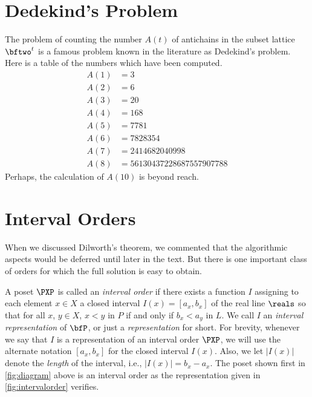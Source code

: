 \section{Dedekind's Problem}\label{s:posets:subset-lattice:dedekind}

The problem of counting the number $A(t)$ of antichains 
in the subset lattice $\bftwo^t$ is a famous problem known 
in the literature as Dedekind's problem.  Here is a table of 
the numbers which have been computed.
\begin{align*}
A(1)&=3\\
A(2)&=6\\
A(3)&=20\\
A(4)&=168\\
A(5)&=7781\\
A(6)&=7828354\\
A(7)&=2414682040998\\
A(8)&=56130437228687557907788
\end{align*}
Perhaps, the calculation of $A(10)$ is beyond reach.

\section{Interval Orders}\label{s:posets:intervalorder}

When we discussed Dilworth's theorem, we commented that the
algorithmic aspects would be deferred until later in the text.  But
there is one important class of orders for which the full solution is
easy to obtain.

A poset $\PXP$ is called an \textit{interval order} if there
exists a function $I$ assigning to each element $x\in X$ a closed
interval $I(x)=[a_x,b_x]$ of the real line $\reals$ so that for
all $x$, $y\in X$, $x<y$ in $P$ if and only if $b_x<a_y$ in $L$.
We call $I$ an \textit{interval representation}
of $\bfP$, or just a \textit{representation} for short.
For brevity, whenever we say that $I$ is a representation of an
interval order $\PXP$, we will use the alternate notation $[a_x,b_x]$ for
the closed interval $I(x)$.  Also, we let $|I(x)|$ denote the
\textit{length} of the interval, i.e., $|I(x)|=b_x-a_x$. 
The poset shown first in \autoref{fig:diagram} above is
an interval order as the representation given in
\autoref{fig:intervalorder} verifies.

